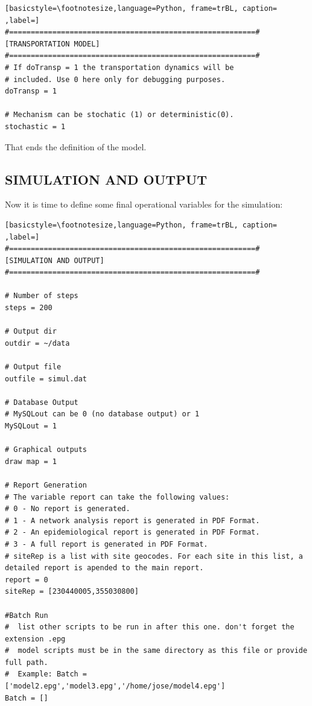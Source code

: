 \begin{lstlisting}[basicstyle=\footnotesize,language=Python, frame=trBL, caption= ,label=]
#=========================================================#
[TRANSPORTATION MODEL]
#=========================================================#
# If doTransp = 1 the transportation dynamics will be 
# included. Use 0 here only for debugging purposes.
doTransp = 1

# Mechanism can be stochatic (1) or deterministic(0). 
stochastic = 1

\end{lstlisting}

That ends the definition of the model. 
\subsection{SIMULATION AND OUTPUT}
Now it is time to define some final operational variables for the simulation:

\begin{lstlisting}[basicstyle=\footnotesize,language=Python, frame=trBL, caption= ,label=]
#=========================================================#
[SIMULATION AND OUTPUT]
#=========================================================#

# Number of steps
steps = 200

# Output dir
outdir = ~/data

# Output file
outfile = simul.dat

# Database Output
# MySQLout can be 0 (no database output) or 1
MySQLout = 1 

# Graphical outputs
draw map = 1

# Report Generation
# The variable report can take the following values:
# 0 - No report is generated.
# 1 - A network analysis report is generated in PDF Format.
# 2 - An epidemiological report is generated in PDF Format.
# 3 - A full report is generated in PDF Format.
# siteRep is a list with site geocodes. For each site in this list, a detailed report is apended to the main report.
report = 0
siteRep = [230440005,355030800]

#Batch Run
#  list other scripts to be run in after this one. don't forget the extension .epg
#  model scripts must be in the same directory as this file or provide full path.
#  Example: Batch = ['model2.epg','model3.epg','/home/jose/model4.epg']
Batch = []
\end{lstlisting}

